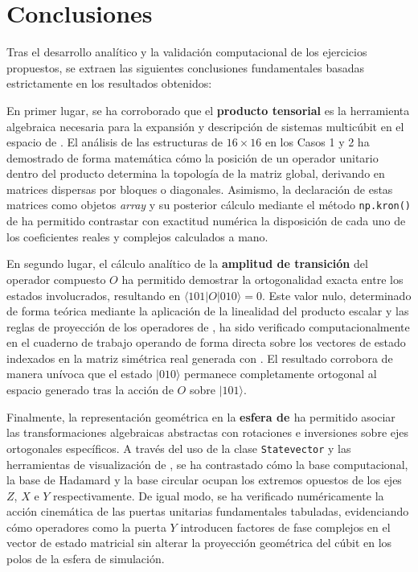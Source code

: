 \documentclass[11pt,a4paper,spanish]{book}
\begin{document}
\chapter{Conclusiones}

Tras el desarrollo analítico y la validación computacional de los ejercicios propuestos, se extraen las siguientes conclusiones fundamentales basadas estrictamente en los resultados obtenidos:

En primer lugar, se ha corroborado que el \textbf{producto tensorial} es la herramienta algebraica necesaria para la expansión y descripción de sistemas multicúbit en el espacio de \cite{hilbert1912}. El análisis de las estructuras de $16 \times 16$ en los Casos 1 y 2 ha demostrado de forma matemática cómo la posición de un operador unitario dentro del producto determina la topología de la matriz global, derivando en matrices dispersas por bloques o diagonales. Asimismo, la declaración de estas matrices como objetos \textit{array} y su posterior cálculo mediante el método \texttt{np.kron()} de \cite{numpy2020} ha permitido contrastar con exactitud numérica la disposición de cada uno de los coeficientes reales y complejos calculados a mano.

En segundo lugar, el cálculo analítico de la \textbf{amplitud de transición} del operador compuesto $O$ ha permitido demostrar la ortogonalidad exacta entre los estados involucrados, resultando en $\langle 101 | O | 010 \rangle = 0$. Este valor nulo, determinado de forma teórica mediante la aplicación de la linealidad del producto escalar y las reglas de proyección de los operadores de \cite{pauli1927}, ha sido verificado computacionalmente en el cuaderno de trabajo operando de forma directa sobre los vectores de estado indexados en la matriz simétrica real generada con \cite{numpy2020}. El resultado corrobora de manera unívoca que el estado $|010\rangle$ permanece completamente ortogonal al espacio generado tras la acción de $O$ sobre $|101\rangle$.

Finalmente, la representación geométrica en la \textbf{esfera de \cite{bloch1946}} ha permitido asociar las transformaciones algebraicas abstractas con rotaciones e inversiones sobre ejes ortogonales específicos. A través del uso de la clase \texttt{Statevector} y las herramientas de visualización de \cite{qiskit2023}, se ha contrastado cómo la base computacional, la base de Hadamard \citep{deutsch1985} y la base circular ocupan los extremos opuestos de los ejes $Z$, $X$ e $Y$ respectivamente. De igual modo, se ha verificado numéricamente la acción cinemática de las puertas unitarias fundamentales tabuladas, evidenciando cómo operadores como la puerta $Y$ \citep{pauli1927} introducen factores de fase complejos en el vector de estado matricial sin alterar la proyección geométrica del cúbit en los polos de la esfera de simulación.
\end{document}
